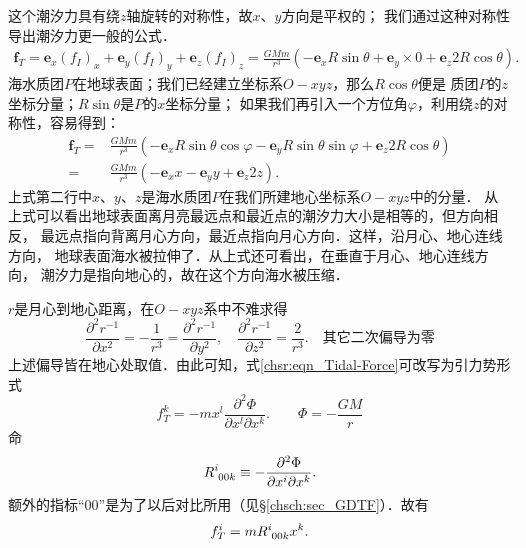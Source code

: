 这个潮汐力具有绕$z$轴旋转的对称性，故$x$、$y$方向是平权的；
我们通过这种对称性导出潮汐力更一般的公式．
\setlength{\mathindent}{0em}
\begin{align*}
    \boldsymbol{f}_T = \boldsymbol{e}_x \left(f_{I}\right)_x + \boldsymbol{e}_y \left(f_{I}\right)_y
    + \boldsymbol{e}_z \left(f_{I}\right)_z
    = \frac{GMm}{r^3}  \left( -\boldsymbol{e}_x R \sin\theta + \boldsymbol{e}_y \times 0
    + \boldsymbol{e}_z 2 R \cos \theta \right).
\end{align*}\setlength{\mathindent}{2em}
海水质团$P$在地球表面；我们已经建立坐标系$O-xyz$，那么$R \cos \theta$便是
质团$P$的$z$坐标分量；$R \sin\theta$是$P$的$x$坐标分量；
如果我们再引入一个方位角$\varphi$，利用绕$z$的对称性，容易得到：
\begin{equation}\label{chsr:eqn_Tidal-Force}
    \begin{aligned}
    \boldsymbol{f}_T =& \frac{GMm}{r^3}  \left( -\boldsymbol{e}_x R \sin\theta \cos\varphi
    - \boldsymbol{e}_y  R \sin\theta \sin\varphi
    + \boldsymbol{e}_z 2 R \cos \theta \right) \\
    =&\frac{GMm}{r^3}  \left( -\boldsymbol{e}_x x - \boldsymbol{e}_y  y
     + \boldsymbol{e}_z 2 z \right) .
    \end{aligned}
\end{equation}
上式第二行中$x$、$y$、$z$是海水质团$P$在我们所建地心坐标系$O-xyz$中的分量．
从上式可以看出地球表面离月亮最远点和最近点的潮汐力大小是相等的，但方向相反，
最远点指向背离月心方向，最近点指向月心方向．这样，沿月心、地心连线方向，
地球表面海水被拉伸了．从上式还可看出，在垂直于月心、地心连线方向，
潮汐力是指向地心的，故在这个方向海水被压缩．

$r$是月心到地心距离，在$O-xyz$系中不难求得
\begin{equation}
    \frac{\partial^2 r^{-1}}{\partial x^2 } =-\frac{1}{r^3} =\frac{\partial^2 r^{-1}}{\partial y^2 } ,
    \quad \frac{\partial^2 r^{-1}}{\partial z^2 } = \frac{2}{r^3}.
    \quad \text{其它二次偏导为零}
\end{equation}
上述偏导皆在地心处取值．由此可知，式\eqref{chsr:eqn_Tidal-Force}可改写为引力势形式
\begin{equation}
    {f}_T^k = -m x^l  \frac{\partial^2 \Phi }{\partial x^l \partial x^k} .
    \qquad \Phi = -\frac{G M }{r} 
\end{equation}
命
\begin{equation}\label{chsr:eqn_Ri00k}
    R_{\hphantom{i}00k}^i  \equiv - \frac{\partial^2 \Phi }{\partial x^i \partial x^k}.
\end{equation}
额外的指标“00”是为了以后对比所用（见\S\ref{chsch:sec_GDTF}）．故有
\begin{equation}\label{chsr:eqn_TF-R}
    f^i_T =  m R_{\hphantom{i}00k}^i x^k .
\end{equation}


